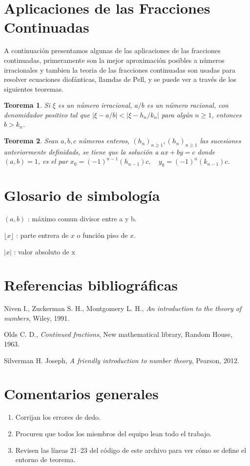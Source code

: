 \documentclass[11pt, article]{article}
\newtheorem{theorem}{Teorema} %
\begin{document}
    \section*{Aplicaciones de las Fracciones Continuadas}
     A continuación presentamos algunas de las aplicaciones de las fracciones continuadas, primeramente son la mejor aproximación posibles a números irracionales y tambien la teoria de las fracciones continuadas son usadas para resolver ecuaciones diofánticas, llamdas de Pell, y se puede ver a través de los siguientes teoremas.
     
     \begin{theorem}
         Si $\xi$ es un número irracional, $a/b$ es un número racional, con denomidador positivo tal que $|\xi - a/b|<|\xi-h_n/k_n|$ para algún $n\geq 1$, entonces $b>k_n$.
     \end{theorem} 
     
    \begin{theorem}
        Sean  $a,b,c$ números enteros, $(h_n)_{n\geq 1}, (h_n)_{n\geq 1}$ las sucesiones anteriormente definidads, se tiene que la solución a $ax+by=c$ donde $(a,b)=1$, es el par $x_0 = (-1)^{n-1} (h_{n-1})c,\quad y_0=(-1)^n (k_{n-1})c$.
     
    \end{theorem} 
    
     \section*{Glosario de simbología}
     
     $(a,b)$ : máximo comun divisor entre a y b.
     
     $\lfloor x \rfloor$ : parte entrera  de $x$ o función piso de $x$.
     
     $|x|$ : valor absoluto de x
     
     
     
     \section*{Referencias bibliográficas}
     Niven I., Zuckerman S. H., Montgomery L. H., \textit{An introduction to the theory of numbers}, Wiley, 1991.
    
      Olds C. D., \textit{Continued fractions}, New mathematical library, Random House, 1963.
     
     Silverman H. Joseph, \textit{A friendly introduction to number theory}, Pearson, 2012.
     {\color{red}
    \section*{Comentarios generales}
    \begin{enumerate}
        \item Corrijan los errores de dedo.
        \item Procuren que todos los miembros del equipo lean todo el trabajo.
        \item Revisen las líneas 21--23 del código de este archivo para ver cómo se define el entorno de teorema.
    \end{enumerate}}
\end{document}
